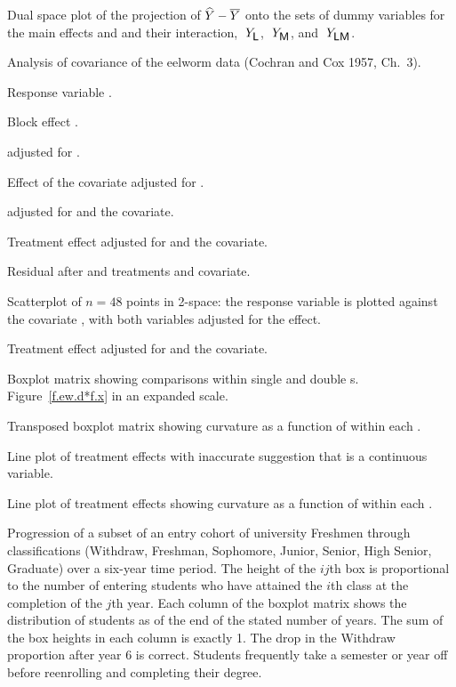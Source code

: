  {Dual space plot of the projection of
$\widehat Y - \Bar Y$ onto the sets of dummy variables for the main
effects  and  and their interaction,
$\;Y_{\mbox{\s{L}}}$, $\;Y_{\mbox{\s{M}}}$, and $\;Y_{\mbox{\s{LM}}}$.
} {}

\clearpage


 {Analysis of covariance of the eelworm data
(Cochran and Cox 1957, Ch.~3).} {}

 {Response variable .} {}

 {Block effect .} {}

 { adjusted for .} {}

 {Effect of the covariate  adjusted for
.} {}

 { adjusted for
 and the covariate.} {}

 {Treatment effect  adjusted for 
and the covariate.} {}

 {Residual after  and treatments and covariate.} {}



 {Scatterplot of $n=48$ points in 2-space: the response variable
 is plotted against the covariate , with both
variables adjusted for the  effect.} {}

\clearpage

 {Treatment effect  adjusted for 
and the covariate.} {}

	 {Boxplot matrix showing comparisons within single and
double s.  Figure~\protect\ref{f.ew.d*f.x} in an expanded
scale. } {}

	 {Transposed boxplot matrix showing curvature as a
function of 
within each .  } {}

 {Line plot of treatment effects with
inaccurate suggestion that  is a continuous variable.} {}

 {Line plot of treatment effects showing curvature as a
function of  within each .}{}


 {Progression of a subset of an entry cohort of
university Freshmen through classifications (Withdraw, Freshman,
Sophomore, Junior, Senior, High Senior, Graduate) over a six-year
time period.  The height of the $ij$th box is proportional to the
number of entering students who have attained the $i$th class at
the completion of the $j$th year.  Each column of the boxplot
matrix shows the distribution of students as of the end of the
stated number of years.  The sum of the box heights in each
column is exactly 1.  The drop in the Withdraw proportion after
year 6 is correct.  Students frequently take a semester or year
off before reenrolling and completing their degree.} {}



